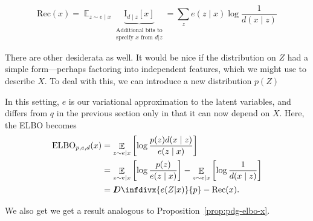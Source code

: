 \documentclass{article}
\theoremstyle{plain}
\theoremstyle{definition}
\DeclareMathOperator*{\Ex}{\mathbb{E}} %
\newcommand{\thickD}{I\mkern-8muD}
\newcommand{\kldiv}{\thickD\infdivx}
\begin{document}
\begin{equation}
 \mathrm{Rec}(x) = \Ex_{z \sim e \mid x} \underbrace{\mathrm I_{d\mid z}[x]}_{\substack{\text{Additional bits to}\\\text{specify $x$ from $d|z$}}}
	= \sum_z e(z \mid x) \log \frac1{d(x \mid z)}\label{eq:rec}
\end{equation}


There are other desiderata as well. It would be nice if the distribution on $Z$ had a simple form---perhaps factoring into independent features, which we might use to describe $X$. To deal with this, we can introduce a new distribution $p(Z)$

In this setting, $e$ is our variational approximation to the latent variables, and differs from $q$ in the previous section only in that it can now depend on $X$. Here, the ELBO becomes
\begin{align*}
	\mathrm{ELBO}_{p,e,d}(x) &= \Ex_{z \sim e|x} \left[\log \frac{p(z) d(x\mid z)}{e(z\mid x)} \right] \\
		&= \Ex_{z \sim e|x}\left[ \log \frac{p(z)}{e(z\mid x)}  \right] - \Ex_{z \sim e|x} \left[\log \frac1{d(x\mid z)} \right] \\
		&= \kldiv{e(Z|x)}{p} - \mathrm{Rec}(x).
\end{align*}

We also get we get a result analogous to Proposition~\ref{prop:pdg-elbo-x}.
\end{document}
